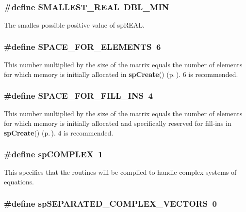 \subsubsection{\setlength{\rightskip}{0pt plus 5cm}\#define SMALLEST\_\-REAL\ DBL\_\-MIN}\label{spConfig_8h_a42}


The smalles possible positive value of sp\-REAL. 
\subsubsection{\setlength{\rightskip}{0pt plus 5cm}\#define SPACE\_\-FOR\_\-ELEMENTS\ 6}\label{spConfig_8h_a25}


This number multiplied by the size of the matrix equals the number of elements for which memory is initially allocated in {\bf sp\-Create}() {\rm (p.\,\pageref{spAllocate_8c_a11})}. 6 is recommended. 
\subsubsection{\setlength{\rightskip}{0pt plus 5cm}\#define SPACE\_\-FOR\_\-FILL\_\-INS\ 4}\label{spConfig_8h_a26}


This number multiplied by the size of the matrix equals the number of elements for which memory is initially allocated and specifically reserved for fill-ins in {\bf sp\-Create}() {\rm (p.\,\pageref{spAllocate_8c_a11})}. 4 is recommended. 
\subsubsection{\setlength{\rightskip}{0pt plus 5cm}\#define sp\-COMPLEX\ 1}\label{spConfig_8h_a21}


This specifies that the routines will be complied to handle complex systems of equations. 
\subsubsection{\setlength{\rightskip}{0pt plus 5cm}\#define sp\-SEPARATED\_\-COMPLEX\_\-VECTORS\ 0}\label{spConfig_8h_a22}


